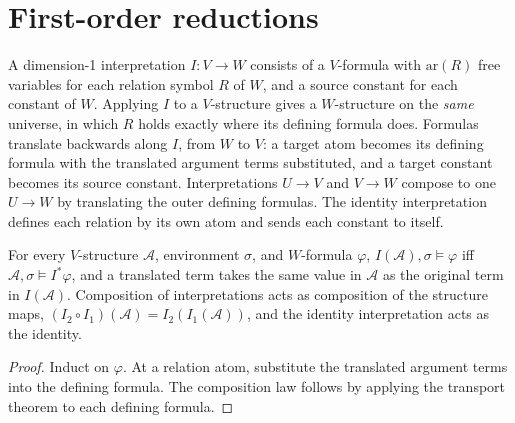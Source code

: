 \section{First-order reductions}

\begin{definition}
  \label{def:desc-interpretation}
  \leanok
  A dimension-1 interpretation $I : V \to W$ consists of a $V$-formula with
  $\mathrm{ar}(R)$ free variables for each relation symbol $R$ of $W$, and a
  source constant for each constant of $W$. Applying $I$ to a $V$-structure gives
  a $W$-structure on the \emph{same} universe, in which $R$ holds exactly where
  its defining formula does. Formulas translate backwards along $I$, from $W$ to
  $V$: a target atom becomes its defining formula with the translated argument
  terms substituted, and a target constant becomes its source constant.
  Interpretations $U \to V$ and $V \to W$ compose to one $U \to W$ by translating
  the outer defining formulas. The identity interpretation defines each relation
  by its own atom and sends each constant to itself.
\end{definition}

\begin{theorem}
  \label{thm:desc-transport}
  \leanok
  For every $V$-structure $\mathcal{A}$, environment $\sigma$, and $W$-formula
  $\varphi$, $I(\mathcal{A}), \sigma \models \varphi$ iff
  $\mathcal{A}, \sigma \models I^*\varphi$, and a translated term takes the same
  value in $\mathcal{A}$ as the original term in $I(\mathcal{A})$. Composition of
  interpretations acts as composition of the structure maps,
  $(I_2 \circ I_1)(\mathcal{A}) = I_2(I_1(\mathcal{A}))$, and the identity
  interpretation acts as the identity.
\end{theorem}
\begin{proof}
  \leanok
  Induct on $\varphi$. At a relation atom, substitute the translated argument
  terms into the defining formula. The composition law follows by applying the
  transport theorem to each defining formula.
\end{proof}

